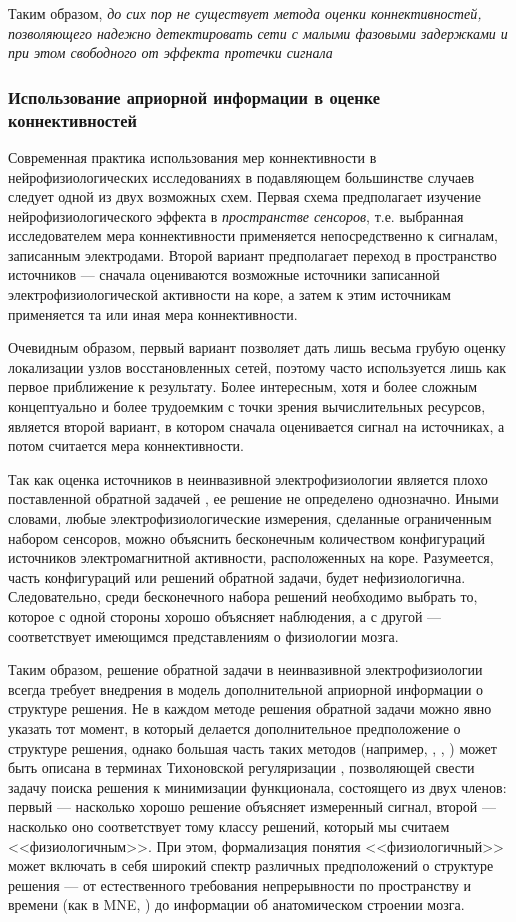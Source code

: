 Таким образом, \emph{до сих пор не существует метода оценки коннективностей,
позволяющего надежно детектировать сети с малыми фазовыми задержками и при этом свободного
от эффекта протечки сигнала}


\subsubsection*{Использование априорной информации в оценке коннективностей}

Современная практика использования мер коннективности в нейрофизиологических
исследованиях в подавляющем большинстве случаев следует одной из двух возможных схем.
Первая схема предполагает изучение нейрофизиологического эффекта  в \emph{пространстве сенсоров},
т.е. выбранная исследователем мера коннективности применяется непосредственно к сигналам,
записанным электродами.
Второй вариант предполагает переход в пространство источников --- сначала оцениваются
возможные источники записанной электрофизиологической активности на коре, а затем к этим
источникам применяется та или иная  мера коннективности.

Очевидным образом, первый вариант позволяет дать лишь весьма грубую оценку локализации
узлов восстановленных сетей, поэтому часто используется лишь как первое приближение к результату.
Более интересным, хотя и более сложным концептуально и более
трудоемким с точки зрения вычислительных ресурсов, является второй вариант, в котором
сначала оценивается сигнал на источниках, а потом считается мера коннективности.

Так как оценка источников в неинвазивной электрофизиологии является
плохо поставленной обратной задачей ,
ее решение не определено однозначно. Иными словами, любые электрофизиологические измерения,
сделанные ограниченным набором сенсоров, можно объяснить бесконечным количеством конфигураций
источников электромагнитной активности, расположенных на коре. Разумеется, часть конфигураций
или решений обратной задачи, будет нефизиологична. Следовательно, среди бесконечного набора
решений необходимо выбрать то, которое с одной стороны хорошо объясняет наблюдения, а с другой ---
соответствует имеющимся представлениям о физиологии мозга.

Таким образом, решение обратной задачи в неинвазивной электрофизиологии всегда требует внедрения
в модель дополнительной априорной информации о структуре решения. Не в каждом методе
решения обратной задачи можно явно указать тот момент, в который делается дополнительное
предположение о структуре решения, однако большая часть таких методов
(например, \cite{mne}, \cite{min_current}, \cite{loreta})
может быть описана в терминах Тихоновской регуляризации \cite{tikhonov}, позволяющей свести задачу поиска
решения к минимизации функционала, состоящего из двух членов: первый --- насколько хорошо
решение объясняет измеренный сигнал, второй --- насколько оно соответствует тому классу решений,
который мы считаем <<физиологичным>>. При этом, формализация понятия <<физиологичный>> может
включать в себя широкий спектр различных предположений о структуре решения
--- от естественного требования непрерывности по пространству и времени (как в MNE, \cite{mne}) до
информации об анатомическом строении мозга.


